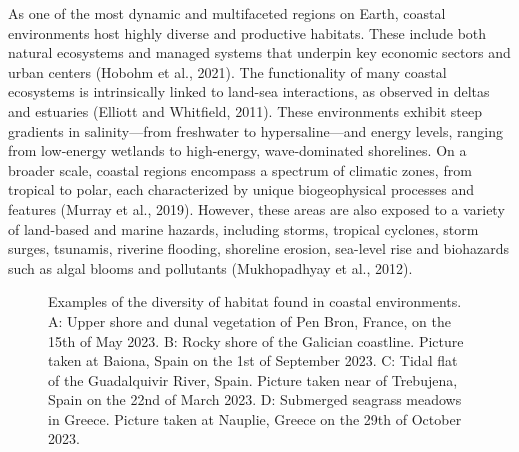 \documentclass[
  letterpaper,
  11pt,
  english,
  singlespacing,
  headsepline]{MastersDoctoralThesis}
\begin{document}
\begin{spacing}{1.5}
As one of the most dynamic and multifaceted regions on Earth, coastal
environments host highly diverse and productive habitats. These include
both natural ecosystems and managed systems that underpin key economic
sectors and urban centers (Hobohm et al., 2021). The functionality of
many coastal ecosystems is intrinsically linked to land-sea
interactions, as observed in deltas and estuaries (Elliott and
Whitfield, 2011). These environments exhibit steep gradients in
salinity---from freshwater to hypersaline---and energy levels, ranging
from low-energy wetlands to high-energy, wave-dominated shorelines. On a
broader scale, coastal regions encompass a spectrum of climatic zones,
from tropical to polar, each characterized by unique biogeophysical
processes and features (Murray et al., 2019). However, these areas are
also exposed to a variety of land-based and marine hazards, including
storms, tropical cyclones, storm surges, tsunamis, riverine flooding,
shoreline erosion, sea-level rise and biohazards such as algal blooms
and pollutants (Mukhopadhyay et al., 2012).

\begin{adjustwidth}{-10cm}{-10cm} 

\begin{figure}


\caption{\label{fig-CoastalHabitat}Examples of the diversity of habitat
found in coastal environments. A: Upper shore and dunal vegetation of
Pen Bron, France, on the 15th of May 2023. B: Rocky shore of the
Galician coastline. Picture taken at Baiona, Spain on the 1st of
September 2023. C: Tidal flat of the Guadalquivir River, Spain. Picture
taken near of Trebujena, Spain on the 22nd of March 2023. D: Submerged
seagrass meadows in Greece. Picture taken at Nauplie, Greece on the 29th
of October 2023.}


\end{figure}
\end{adjustwidth}
\end{spacing}
\end{document}
